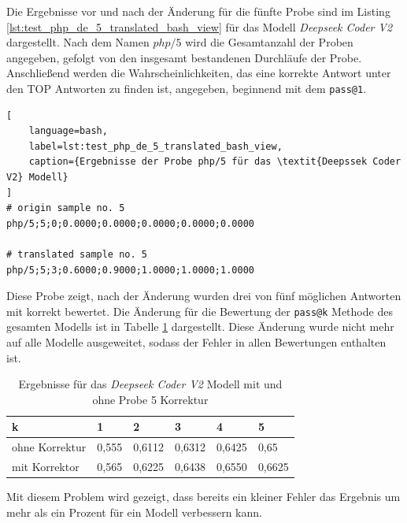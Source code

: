 Die Ergebnisse vor und nach der Änderung für die fünfte Probe sind im Listing \ref{lst:test_php_de_5_translated_bash_view} für das Modell \textit{Deepseek Coder V2} dargestellt. Nach dem Namen $php/5$ wird die Gesamtanzahl der Proben angegeben, gefolgt von den insgesamt bestandenen Durchläufe der Probe. Anschließend werden die Wahrscheinlichkeiten, das eine korrekte Antwort unter den TOP Antworten zu finden ist, angegeben, beginnend mit dem \texttt{pass@1}.\vspace{0.2cm}

\begin{lstlisting}[
	language=bash,
	label=lst:test_php_de_5_translated_bash_view,
	caption={Ergebnisse der Probe php/5 für das \textit{Deepssek Coder V2} Modell}
]
# origin sample no. 5
php/5;5;0;0.0000;0.0000;0.0000;0.0000;0.0000

# translated sample no. 5
php/5;5;3;0.6000;0.9000;1.0000;1.0000;1.0000
\end{lstlisting}

Diese Probe zeigt, nach der Änderung wurden drei von fünf möglichen Antworten mit korrekt bewertet. Die Änderung für die Bewertung der \texttt{pass@k} Methode des gesamten Modells ist in Tabelle \ref{tab:pass_at_k_results_bevor_after_translate} dargestellt. Diese Änderung wurde nicht mehr auf alle Modelle ausgeweitet, sodass der Fehler in allen Bewertungen enthalten ist.\vspace{0.2cm}

\begin{table}[!ht]
	\begin{tabular}{|l|lllll|}
		\hline
		k & 1 & 2 & 3 & 4 & 5 \\
		\hline
		ohne Korrektur & 0,555 & 0,6112 & 0,6312 & 0,6425 & 0,65 \\
		mit Korrektor  & 0,565 & 0,6225 & 0,6438 & 0,6550 & 0,6625 \\
		\hline
		\hline
	\end{tabular}\centering
	\label{tab:pass_at_k_results_bevor_after_translate}
	\caption{Ergebnisse für das \textit{Deepseek Coder V2} Modell mit und ohne Probe 5 Korrektur }
\end{table}

Mit diesem Problem wird gezeigt, dass bereits ein kleiner Fehler das Ergebnis um mehr als ein Prozent für ein Modell verbessern kann.\vspace{0.2cm}

